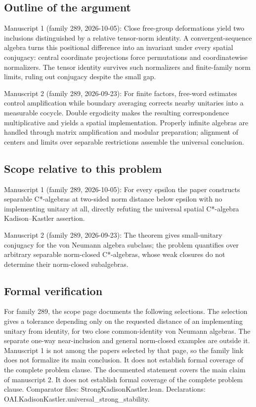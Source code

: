 \documentclass[11pt]{article}
\begin{document}
\subsection{Outline of the argument}
Manuscript 1 (family 289, 2026-10-05): Close free-group deformations yield two inclusions distinguished by a relative tensor-norm identity. A convergent-sequence algebra turns this positional difference into an invariant under every spatial conjugacy: central coordinate projections force permutations and coordinatewise normalizers. The tensor identity survives such normalizers and finite-family norm limits, ruling out conjugacy despite the small gap.

Manuscript 2 (family 289, 2026-09-23): For finite factors, free-word estimates control amplification while boundary averaging corrects nearby unitaries into a measurable cocycle. Double ergodicity makes the resulting correspondence multiplicative and yields a spatial implementation. Properly infinite algebras are handled through matrix amplification and modular preparation; alignment of centers and limits over separable restrictions assemble the universal conclusion.

\subsection{Scope relative to this problem}
Manuscript 1 (family 289, 2026-10-05): For every epsilon the paper constructs separable C*-algebras at two-sided norm distance below epsilon with no implementing unitary at all, directly refuting the universal spatial C*-algebra Kadison–Kastler assertion.

Manuscript 2 (family 289, 2026-09-23): The theorem gives small-unitary conjugacy for the von Neumann algebra subclass; the problem quantifies over arbitrary separable norm-closed C*-algebras, whose weak closures do not determine their norm-closed subalgebras.

\subsection{Formal verification}
For family 289, the scope page documents the following selections. The selection gives a tolerance depending only on the requested distance of an implementing unitary from identity, for two close common-identity von Neumann algebras. The separate one-way near-inclusion and general norm-closed examples are outside it. Manuscript 1 is not among the papers selected by that page, so the family link does not formalize its main conclusion. It does not establish formal coverage of the complete problem clause. The documented statement covers the main claim of manuscript 2. It does not establish formal coverage of the complete problem clause. Comparator files: StrongKadisonKastler.lean. Declarations: OAI.KadisonKastler.universal\_strong\_stability.
\end{document}
